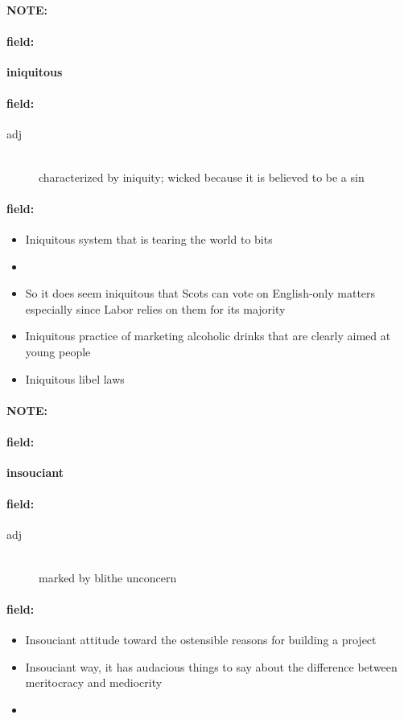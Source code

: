 \documentclass[12pt]{article}
\newenvironment{note}{\paragraph{NOTE:}}{}
\newenvironment{field}{\paragraph{field:}}{}
\begin{document}
\begin{note}
\begin{field}
\textbf{\large iniquitous}
\end{field}


\begin{field}
\begin{description}
\item[adj] \hfill \\ 
characterized by iniquity; wicked because it is believed to be a sin

\end{description}
\end{field}

\begin{field}
\begin{itemize}
\item Iniquitous system that is tearing the world to bits
\item 
\item So it does seem iniquitous that Scots can vote on English-only matters  especially since Labor relies on them for its majority
\item Iniquitous practice of marketing alcoholic drinks that are clearly aimed at young people
\item Iniquitous libel laws
\end{itemize}
\end{field}
\end{note}
\begin{note}
\begin{field}
\textbf{\large insouciant}
\end{field}


\begin{field}
\begin{description}
\item[adj] \hfill \\ 
marked by blithe unconcern

\end{description}
\end{field}

\begin{field}
\begin{itemize}
\item Insouciant attitude toward the ostensible reasons for building a project
\item Insouciant way, it has audacious things to say about the difference between meritocracy and mediocrity
\item 
\end{itemize}
\end{field}
\end{note}
\end{document}
